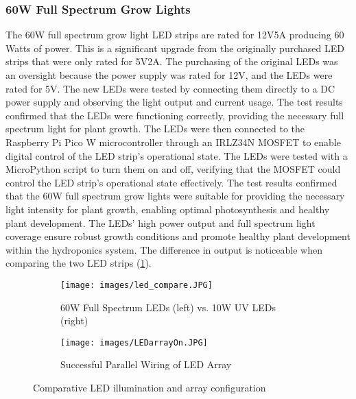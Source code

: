 \documentclass[12pt]{article} %
\begin{document}
\subsubsection{60W Full Spectrum Grow Lights}
\noindent The 60W full spectrum grow light LED strips \cite{ref_growled} are rated for 12V5A producing 60 Watts of power. This is a significant upgrade from the originally purchased LED strips \cite{ref_oldled} that were only rated for 5V2A. The purchasing of the original LEDs was an oversight because the power supply was rated for 12V, and the LEDs were rated for 5V. The new LEDs were tested by connecting them directly to a DC power supply and observing the light output and current usage. The test results confirmed that the LEDs were functioning correctly, providing the necessary full spectrum light for plant growth. The LEDs were then connected to the Raspberry Pi Pico W microcontroller through an IRLZ34N MOSFET to enable digital control of the LED strip's operational state. The LEDs were tested with a MicroPython script to turn them on and off, verifying that the MOSFET could control the LED strip's operational state effectively. The test results confirmed that the 60W full spectrum grow lights were suitable for providing the necessary light intensity for plant growth, enabling optimal photosynthesis and healthy plant development. The LEDs' high power output and full spectrum light coverage ensure robust growth conditions and promote healthy plant development within the hydroponics system. The difference in output is noticeable when comparing the two LED strips (\ref{fig:LED_Compare}).
\begin{figure}[H]
    \centering
    \begin{subfigure}[b]{0.5\textwidth}
      \texttt{[image: images/led\_compare.JPG]}
      \caption{60W Full Spectrum LEDs (left) vs. 10W UV LEDs (right)}
      \label{fig:LED_Compare}
    \end{subfigure}
    \hfill %
    \begin{subfigure}[b]{0.5\textwidth}
      \texttt{[image: images/LEDarrayOn.JPG]}
      \caption{Successful Parallel Wiring of LED Array}
      \label{fig:Light Array On}
    \end{subfigure}
    \caption{Comparative LED illumination and array configuration}
    \label{fig:LED_Illumination_and_Array}
  \end{figure}

\pagebreak
\end{document}
